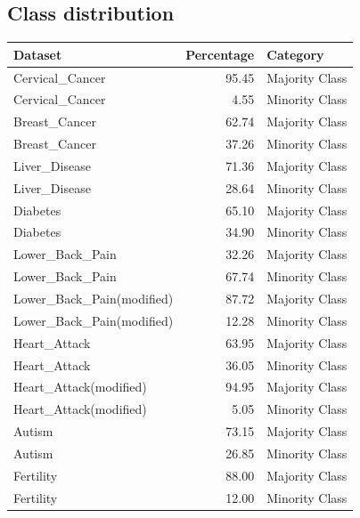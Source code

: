\subsection{Class distribution}


\begin{table}[ht]
\centering
\begin{tabular}{lrl}
  \hline
Dataset & Percentage & Category \\ 
  \hline
Cervical\_Cancer & 95.45 & Majority Class \\ 
  Cervical\_Cancer & 4.55 & Minority Class \\ 
  Breast\_Cancer & 62.74 & Majority Class \\ 
  Breast\_Cancer & 37.26 & Minority Class \\ 
  Liver\_Disease & 71.36 & Majority Class \\ 
  Liver\_Disease & 28.64 & Minority Class \\ 
  Diabetes & 65.10 & Majority Class \\ 
  Diabetes & 34.90 & Minority Class \\ 
  Lower\_Back\_Pain & 32.26 & Majority Class \\ 
  Lower\_Back\_Pain & 67.74 & Minority Class \\ 
  Lower\_Back\_Pain(modified) & 87.72 & Majority Class \\ 
  Lower\_Back\_Pain(modified) & 12.28 & Minority Class \\ 
  Heart\_Attack & 63.95 & Majority Class \\ 
  Heart\_Attack & 36.05 & Minority Class \\ 
  Heart\_Attack(modified) & 94.95 & Majority Class \\ 
  Heart\_Attack(modified) & 5.05 & Minority Class \\ 
  Autism & 73.15 & Majority Class \\ 
  Autism & 26.85 & Minority Class \\ 
  Fertility & 88.00 & Majority Class \\ 
  Fertility & 12.00 & Minority Class \\ 
   \hline
\end{tabular}
\end{table}

